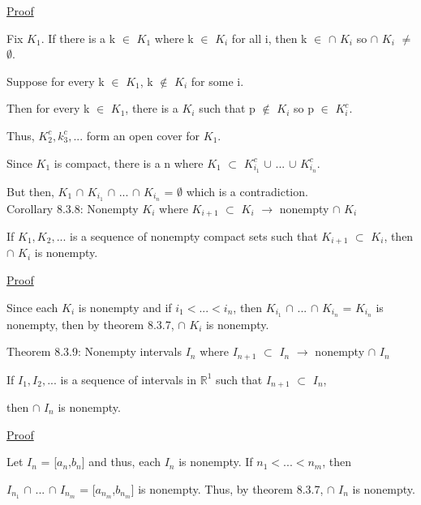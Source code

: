 { \color{magenta} \underline{Proof} } 

	Fix $K_1$.
	If there is a k $\in$ $K_1$ where k $\in$ $K_i$ for all i, then
	k $\in$ $\cap$ $K_i$ so $\cap$ $K_i$ $\not =$ $\emptyset$.

	Suppose for every k $\in$ $K_1$, k $\not \in$ $K_i$ for some i.

	Then for every k $\in$ $K_1$, there is a $K_i$ such that
	p $\not \in$ $K_i$ so p $\in$ $K_i^c$.

	Thus, $K_2^c, k_3^c, ...$ form an open cover for $K_1$.

	Since $K_1$ is compact, there is a n where
	$K_1$ $\subset$ $K_{i_1}^c$ $\cup$ ... $\cup$ $K_{i_n}^c$.

	But then, $K_1$ $\cap$ $K_{i_1}$ $\cap$ ... $\cap$ $K_{i_n}$
	= $\emptyset$ which is a contradiction. \\

{ \color{orange} Corollary 8.3.8: Nonempty $K_i$ where $K_{i+1}$ $\subset$ $K_i$
$\rightarrow$ nonempty $\cap$ $K_i$}

	\begin{adjustbox}{minipage=14cm, right, vspace=0.1cm 0cm}
		If $K_1, K_2, ...$ is a sequence of nonempty compact sets
		such that $K_{i+1}$ $\subset$ $K_i$, then $\cap$ $K_i$ is nonempty.
	\end{adjustbox}

{ \color{magenta} \underline{Proof} } 

	Since each $K_i$ is nonempty and if $i_1 < ... < i_n$, then
	$K_{i_1}$ $\cap$ ... $\cap$ $K_{i_n}$
	= $K_{i_n}$ is nonempty, then
	by {\color{red} theorem 8.3.7}, $\cap$ $K_i$ is nonempty. \\

\newpage

{ \color{red} Theorem 8.3.9: Nonempty intervals $I_n$ where
$I_{n+1}$ $\subset$ $I_n$ $\rightarrow$ nonempty $\cap$ $I_n$}

	\begin{adjustbox}{minipage=14cm, right, vspace=0.1cm 0cm}
		If $I_1, I_2, ...$ is a sequence of intervals in $\mathbb{R}^1$
		such that $I_{n+1}$ $\subset$ $I_n$,
		
		then $\cap$ $I_n$ is nonempty.
	\end{adjustbox}

{ \color{magenta} \underline{Proof} } 

	Let $I_n$ = [$a_n$,$b_n$] and thus, each $I_n$ is nonempty.
	If $n_1 < ... < n_m$, then

	$I_{n_1}$ $\cap$ ... $\cap$ $I_{n_m}$
	= [$a_{n_m}$,$b_{n_m}$] is nonempty.
	Thus, by {\color{red} theorem 8.3.7}, $\cap$ $I_n$ is nonempty. \\

